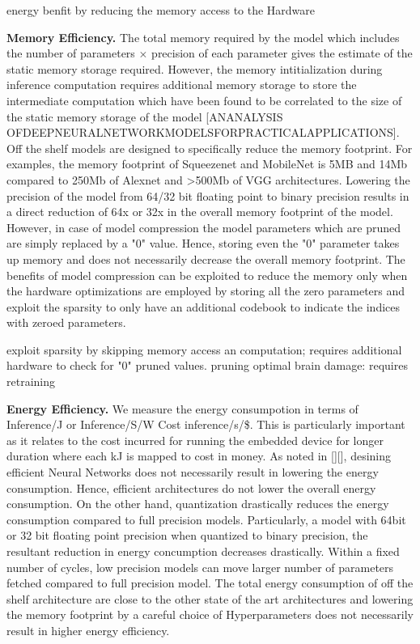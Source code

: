 energy benfit by reducing the memory access to the Hardware

\noindent\textbf{Memory Efficiency.} The total memory required by the model which includes the number of parameters $\times$ precision of each parameter gives the estimate of the static memory storage required.
However, the memory intitialization during inference computation requires additional memory storage to store the intermediate computation which have been found to be correlated to the size of the static memory storage of the model [ANANALYSIS  OFDEEPNEURALNETWORKMODELSFORPRACTICALAPPLICATIONS].
Off the shelf models are designed to specifically reduce the memory footprint. For examples, the memory footprint of Squeezenet and MobileNet is 5MB and 14Mb compared to 250Mb of Alexnet and >500Mb of VGG architectures.
Lowering the precision of the model from 64/32 bit  floating point to binary precision results in a direct reduction of 64x or 32x in the overall memory footprint of the model.
However, in case of model compression the model parameters which are pruned are simply replaced by a "0" value. Hence, storing even the "0" parameter takes up memory and does not necessarily decrease the overall memory footprint.
The benefits of model compression can be exploited to reduce the memory only when the hardware optimizations are employed by storing all the zero parameters and exploit the sparsity to only have an additional codebook to indicate the indices with zeroed parameters.

exploit sparsity by skipping memory access an computation; requires additional hardware to check for "0" pruned values.
pruning optimal brain damage: requires retraining

\noindent\textbf{Energy Efficiency.} We measure the energy consumpotion in terms of Inference/J or Inference/S/W Cost inference/s/\$.
This is particularly important as it relates to the cost incurred for running the embedded device for longer duration where each kJ is mapped to cost in money.
As noted in [][], desining efficient Neural Networks does not necessarily result in lowering the energy consumption.
Hence, efficient architectures do not lower the overall energy consumption.
On the other hand, quantization drastically reduces the energy consumption compared to full precision models.
Particularly, a model with 64bit or 32 bit floating point precision when quantized to binary precision, the resultant reduction in energy concumption decreases drastically.
Within a fixed number of cycles, low precision models can move larger number of parameters fetched compared to full precision model.
The total energy consumption of off the shelf architecture are close to the other state of the art architectures and lowering the memory footprint by a careful choice of Hyperparameters does not necessarily result in higher energy efficiency.

